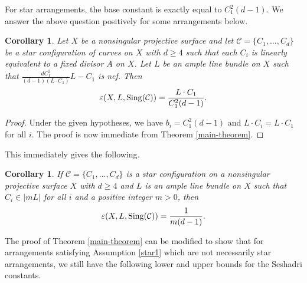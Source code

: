 \documentclass[12pt,reqno]{amsart}
\theoremstyle{plain}
\numberwithin{equation}{section}
\newtheorem{corollary}[theorem]{Corollary}
\theoremstyle{definition}
\begin{document}
	For star arrangements, the base constant is exactly equal to $C_1^2(d-1)$. We answer the above question positively for some arrangements below.  
 



 
	
	\begin{corollary}
		\label{prop:star} Let $X$ be a nonsingular projective surface and let $\mathcal{C} = \{C_{1}, \ldots, C_{d}\}$ be a star configuration of curves on $X$ with $d \geq 4$ such that each $ C_i$ is linearly equivalent to a fixed divisor $A$ on $X$. Let $L$ be an ample line bundle on $X$
		such that  $\frac{dC_1^2}{(d-1)(L\cdot C_1)}L-C_1$ is nef.   Then 
		$$\varepsilon(X, L,{\rm Sing}(\mathcal{C})) = \frac{L\cdot C_1}{C_1^2(d-1)}.$$
	\end{corollary}

 \begin{proof}
Under the given hypotheses, we have $b_i = C_1^2(d-1)$  and $L\cdot C_i = L\cdot C_1$
for all $i$. 
The proof is now immediate from Theorem \ref{main-theorem}.    
 \end{proof} This immediately gives the following. 


	\begin{corollary}
		\label{coro:star}
		If $\mathcal{C} = \{C_{1}, \ldots, C_{d}\}$ is a star configuration on a nonsingular projective surface $X$ with $d \geq 4$  and $L$ is an ample line bundle  on $X$ such that $ C_i \in |mL|$ for all $i$ and a positive integer $m>0$, then 
		$$\varepsilon(X, L,{\rm Sing}(\mathcal{C})) = \frac{1}{m(d-1)}.$$
	\end{corollary}




The proof of Theorem \ref{main-theorem} can be modified to show that for arrangements
satisfying Assumption \ref{star1} which are not necessarily star arrangements, we still have the following lower and upper bounds for the Seshadri constants. 
\end{document}
